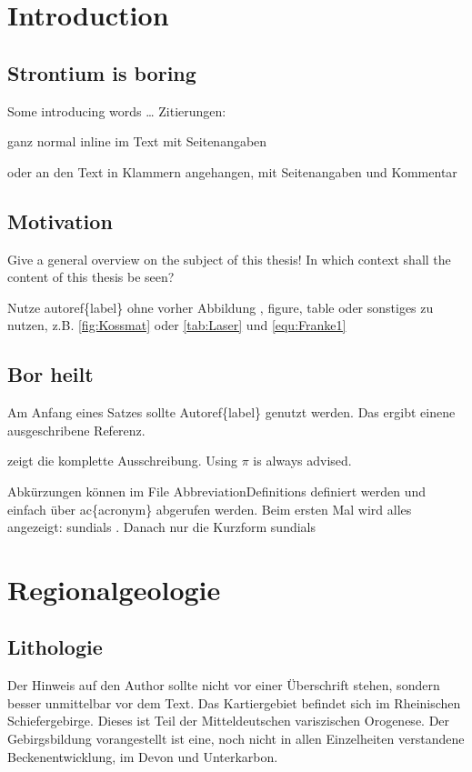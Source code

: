 \chapter{Introduction}
\section{Strontium is boring}
\authorAmSa
Some introducing words \dots
Zitierungen:

ganz normal inline im Text mit Seitenangaben \cite[6]{franke17}

oder an den Text in Klammern angehangen, mit Seitenangaben und Kommentar \autocites(see also his earlier work)[347-348]{franke17}

\section{Motivation}
Give a general overview on the subject of this thesis! In which context shall the content of this thesis  be seen? 

Nutze autoref\{label\} ohne vorher Abbildung , figure, table oder sonstiges zu nutzen, z.B. \autoref{fig:Kossmat} oder \autoref{tab:Laser} und \autoref{equ:Franke1} 

\section{Bor heilt}
Am Anfang eines Satzes sollte Autoref\{label\} genutzt werden. Das ergibt einene ausgeschribene Referenz.

 zeigt die komplette Ausschreibung. Using $\pi$ is always advised.

Abkürzungen können im File AbbreviationDefinitions definiert werden und einfach über ac\{acronym\} abgerufen werden. Beim ersten Mal wird alles angezeigt: \ac{sundials} . Danach nur die Kurzform \ac{sundials}

\chapter{Regionalgeologie}

\section{Lithologie}
\authorAnGu
Der Hinweis auf den Author sollte nicht vor einer Überschrift stehen, sondern besser unmittelbar vor dem Text. Das Kartiergebiet befindet sich im Rheinischen Schiefergebirge. Dieses ist Teil der Mitteldeutschen variszischen Orogenese. Der Gebirgsbildung vorangestellt ist eine, noch nicht in allen Einzelheiten verstandene Beckenentwicklung, im Devon und Unterkarbon. \cite{franke17}

